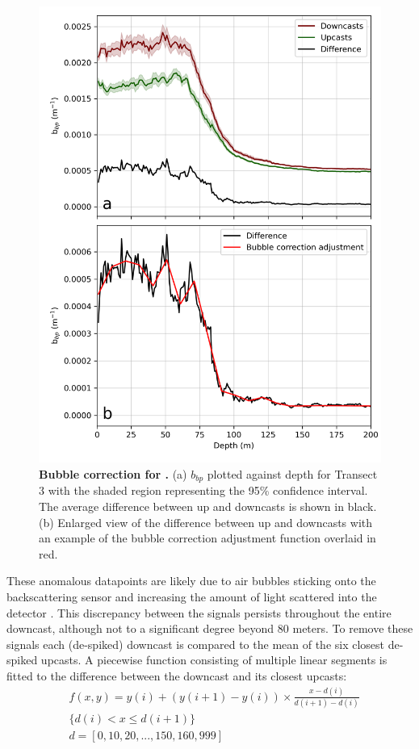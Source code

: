 \documentclass[
	a4paper, %
	10pt, %
	unnumberedsections, %
	twoside, %
]{LTJournalArticle}
\begin{document}
\begin{multicols}{2}
\begin{figure}[H] 
	\includegraphics[width=\linewidth]{Louis/figures/figureF.png}
	\caption{\textbf{Bubble correction for .} (a) $b_{bp}$ plotted against depth for Transect 3 with the shaded region representing the 95\% confidence interval. The average difference between up and downcasts is shown in black. (b) Enlarged view of the difference between up and downcasts with an example of the bubble correction adjustment function overlaid in red.}
	\label{fig:F}
\end{figure}

 
These anomalous datapoints are likely due to air bubbles sticking onto the backscattering sensor
and increasing the amount of light scattered into the detector \citep{ref11}. This discrepancy between the signals
persists throughout the entire downcast, although not to a significant degree beyond 80 meters. To remove these
signals each (de-spiked) downcast is compared to the mean of the six closest de-spiked upcasts. A piecewise function
consisting of multiple linear segments is fitted to the difference between the downcast and its closest upcasts:
\begin{equation}
\label{eq:2}
\begin{split}
	& f(x, y) = y(i) + (y(i+1) - y(i))\times  \frac{x - d(i)}{d(i+1) - d(i)} \\
	& \{ d(i) < x \leq d(i+1) \}  \\
	& d = [0, 10, 20, ..., 150, 160, 999]
\end{split}
\end{equation}


\end{multicols}
\end{document}
